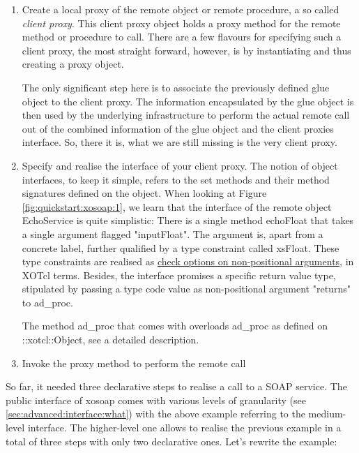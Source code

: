 \begin{enumerate}
\item Create a local proxy of the remote object or remote procedure, a so called \emph{client proxy}. This client proxy object holds a proxy method for the remote method or procedure to 
call. There are a few flavours for specifying such a client proxy, the most straight forward, however, is by 
instantiating  and thus creating a proxy object.

The only significant step here is to associate the previously defined glue object to the client proxy. The 
information encapsulated by the glue object is then used by the underlying infrastructure to perform the actual remote call out of the combined information of the glue object and the client proxies interface. So, there it is, what we are still missing is the very client proxy.
\item Specify and realise the interface of your client proxy. The notion of object interfaces, to keep it 
simple, refers to the set methods and their method signatures defined on the object. When looking at 
Figure \ref{fig:quickstart:xosoap:1}, we learn that the interface of the remote object EchoService is quite 
simplistic: There is a single method echoFloat that takes a single argument flagged "inputFloat". The 
argument is, apart from a concrete label, further qualified by a type constraint called xsFloat. These type 
constraints are realised as \href{http://media.wu-wien.ac.at/doc/tutorial.html#non-pos-args}{check 
options on non-positional arguments}, in XOTcl terms. Besides, the interface promises a specific return 
value type, stipulated by passing a type code value as non-positional argument "returns" to ad\_proc.

The method ad\_proc that comes with  overloads ad\_proc as defined 
on ::xotcl::Object, see  a detailed description.
\item Invoke the proxy method to perform the remote call

\end{enumerate}
So far, it needed three declarative steps to realise a call to a SOAP service. The public interface of 
xosoap comes with various levels of granularity (see \ref{sec:advanced:interface:what}) with the above 
example referring to the medium-level interface. The higher-level one allows to realise the previous 
example in a total of three steps with only two declarative ones. Let's rewrite the example:

